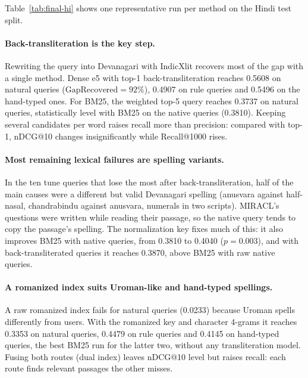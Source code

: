 \documentclass[11pt,a4paper]{article}
\newcommand{\gr}{\mathrm{GapRecovered}}
\begin{document}
Table~\ref{tab:final-hi} shows one representative run per method on the Hindi test split.

\begin{table}[H]
\centering
\caption{Hindi test results, nDCG@10. * significantly better than BM25 with romanized
queries; $\dagger$ significantly better (and $-\dagger$ worse) than the best single method,
dense e5 with top-1 back-transliteration (for native queries: dense e5). Paired $t$-test,
Bonferroni over the table's 71 comparisons. Generated by \texttt{scripts/final\_table.py}.}
\label{tab:final-hi}
\small
\resizebox{\textwidth}{!}{}
\end{table}

\paragraph{Back-transliteration is the key step.}
Rewriting the query into Devanagari with IndicXlit recovers most of the gap with a single
method. Dense e5 with top-1 back-transliteration reaches 0.5608 on natural queries
($\gr = 92\%$), 0.4907 on rule queries and 0.5496 on the hand-typed ones. For BM25, the
weighted top-5 query reaches 0.3737 on natural queries, statistically level with BM25 on the
native queries (0.3810). Keeping several candidates per word raises recall more than
precision: compared with top-1, nDCG@10 changes insignificantly while Recall@1000 rises.

\paragraph{Most remaining lexical failures are spelling variants.}
In the ten tune queries that lose the most after back-transliteration, half of the main
causes were a different but valid Devanagari spelling (anusvara against half-nasal,
chandrabindu against anusvara, numerals in two scripts). MIRACL's questions were written
while reading their passage, so the native query tends to copy the passage's spelling. The
normalization key fixes much of this: it also improves BM25 with native queries, from 0.3810
to 0.4040 ($p = 0.003$), and with back-transliterated queries it reaches 0.3870, above BM25
with raw native queries.

\paragraph{A romanized index suits Uroman-like and hand-typed spellings.}
A raw romanized index fails for natural queries (0.0233) because Uroman spells differently
from users. With the romanized key and character 4-grams it reaches 0.3353 on natural queries,
0.4479 on rule queries and 0.4145 on hand-typed queries, the best BM25 run for the latter two,
without any transliteration model. Fusing both routes (dual index) leaves nDCG@10 level but
raises recall: each route finds relevant passages the other misses.
\end{document}

